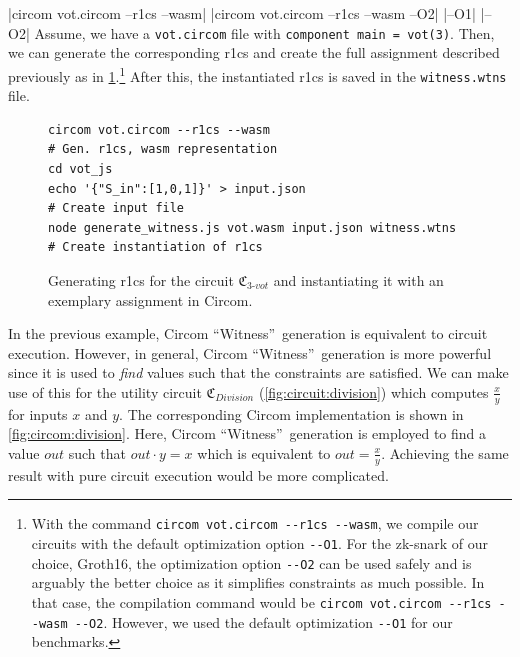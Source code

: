 |circom vot.circom --r1cs --wasm|
|circom vot.circom --r1cs --wasm --O2|
|--O1|
|--O2|
Assume, we have a \verb|vot.circom| file with \verb|component main = vot(3)|.
Then, we can generate the corresponding \gls{r1cs} and create the full assignment described previously as in \cref{fig:shell:circomExample}.\footnote{
    \label{footnote:optimizationOption}
    With the command \Verb|circom vot.circom --r1cs --wasm|, we compile our circuits with the default optimization option \Verb|--O1|.
    For the zk-\gls{snark} of our choice, Groth16, the optimization option \Verb|--O2| can be used safely and is arguably the better choice as it simplifies constraints as much possible.
    In that case, the compilation command would be \Verb|circom vot.circom --r1cs --wasm --O2|.
    However, we used the default optimization \Verb|--O1| for our benchmarks.
}
After this, the instantiated \gls{r1cs} is saved in the \verb|witness.wtns| file.

\begin{figure}[h]
    \centering
    \captionsetup{type=listing}
\begin{lstlisting}[language=Shell]
circom vot.circom --r1cs --wasm                             # Gen. r1cs, wasm representation
cd vot_js                                                   
echo '{"S_in":[1,0,1]}' > input.json                        # Create input file
node generate_witness.js vot.wasm input.json witness.wtns   # Create instantiation of r1cs
\end{lstlisting}
    \caption{Generating \gls{r1cs} for the circuit $\mathfrak{C}_{3\text{-}vot}$ and instantiating it with an exemplary assignment in Circom.}
    \label{fig:shell:circomExample}
\end{figure}

In the previous example, Circom ``Witness''\ generation is equivalent to circuit execution.
However, in general, Circom ``Witness''\ generation is more powerful since it is used to \textit{find} values such that the constraints are satisfied.
We can make use of this for the utility circuit $\mathfrak{C}_{Division}$ (\cref{fig:circuit:division}) which computes $\frac{x}{y}$ for inputs $x$ and $y$.
The corresponding Circom implementation is shown in \cref{fig:circom:division}.
Here, Circom ``Witness''\ generation is employed to find a value $out$ such that $out\cdot y=x$ which is equivalent to $out=\frac{x}{y}$.
Achieving the same result with pure circuit execution would be more complicated.

